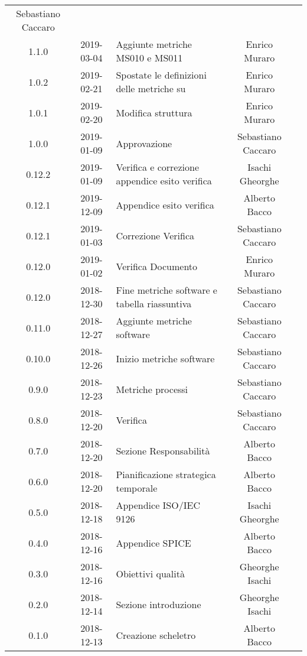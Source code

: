 {\begin{longtable}{c c C{4cm} c  c }
		Sebastiano Caccaro &
		\ver{}
		\\
		1.1.0 &
		2019-03-04 &
		Aggiunte metriche MS010 e MS011 &
		Enrico Muraro &
		\reda{}
		\\
		1.0.2 &
		2019-02-21 &
		Spostate le definizioni delle metriche su \NdP &
		Enrico Muraro &
		\reda{}
		\\
		1.0.1 &
		2019-02-20 &
		Modifica struttura &
		Enrico Muraro &
		\reda{}
		\\
		1.0.0 &
		2019-01-09 &
		Approvazione &
		Sebastiano Caccaro &
		\Res{}
		\\
		0.12.2 &
		2019-01-09 &
		Verifica e correzione appendice esito verifica &
		Isachi Gheorghe &
		\ver{}
		\\
		0.12.1 &
		2019-12-09 &
		Appendice esito verifica &
		Alberto Bacco &
		\ver{}
		\\
		0.12.1 &
		2019-01-03 &
		Correzione Verifica &
		Sebastiano Caccaro &
		\reda{}
		\\
		0.12.0 &
		2019-01-02 &
		Verifica Documento &
		Enrico Muraro &
		\ver{}
		\\
		0.12.0 &
		2018-12-30 &
		Fine metriche software e tabella riassuntiva &
		Sebastiano Caccaro &
		\reda{}
		\\
		0.11.0 &
		2018-12-27 &
		Aggiunte metriche software  &
		Sebastiano Caccaro &
		\reda{}
		\\
		0.10.0 &
		2018-12-26 &
		Inizio metriche software &
		Sebastiano Caccaro &
		\reda{}
		\\
		0.9.0 &
		2018-12-23 &
		Metriche processi &
		Sebastiano Caccaro &
		\reda{}
		\\
		0.8.0 &
		2018-12-20 &
		Verifica &
		Sebastiano Caccaro &
		\reda{}		
		\\
		0.7.0 &
		2018-12-20 &
		Sezione Responsabilità &
		Alberto Bacco &
		\reda{}
		\\
		0.6.0 &
		2018-12-20 &
		Pianificazione strategica temporale &
		Alberto Bacco &
		\reda{}
		\\
		0.5.0 &
		2018-12-18 &
		Appendice ISO/IEC 9126 &
		Isachi Gheorghe &
		\reda{}
		\\
		0.4.0 &
		2018-12-16 &
		Appendice SPICE &
		Alberto Bacco &
		\reda{}
		\\
		0.3.0 &
		2018-12-16 &
		Obiettivi qualità &
		Gheorghe Isachi &
		\reda{}
		\\
		0.2.0 &
		2018-12-14 &
		Sezione introduzione &
		Gheorghe Isachi&
		\reda{}
		\\
		0.1.0 &
		2018-12-13 &
		Creazione scheletro &
		Alberto Bacco&
		\reda{}
		\\
	\end{longtable}

}